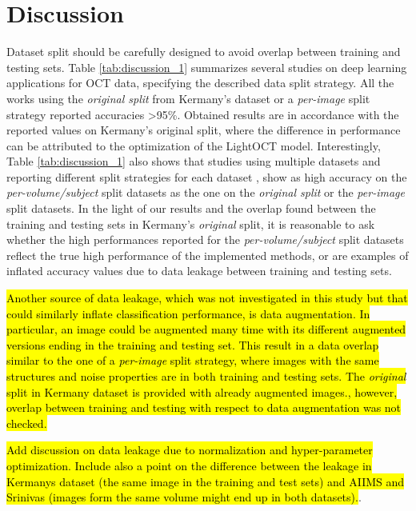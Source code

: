 \documentclass[fleqn,10pt]{wlscirep}
\begin{document}
\section*{Discussion}
Dataset split should be carefully designed to avoid overlap between training and testing sets. Table \ref{tab:discussion_1} summarizes several studies on deep learning applications for OCT data, specifying the described data split strategy. All the works using the \textit{original split} from Kermany’s dataset or a \textit{per-image} split strategy reported accuracies >95\%. Obtained results are in accordance with the reported values on Kermany’s original split, where the difference in performance can be attributed to the optimization of the LightOCT model. Interestingly, Table \ref{tab:discussion_1} also shows that studies using multiple datasets and reporting different split strategies for each dataset \cite{butola2020deep,kamran2019optic, thomas2021novel}, show as high accuracy on the \mbox{\textit{per-volume/subject}} split datasets as the one on the \textit{original split} or the \textit{per-image} split datasets. In the light of our results and the overlap found between the training and testing sets in Kermany’s \textit{original} split, it is reasonable to ask whether the high performances reported for the \textit{per-volume/subject} split datasets reflect the true high performance of the implemented methods, or are examples of inflated accuracy values due to data leakage between training and testing sets. 

\hl{Another source of data leakage, which was not investigated in this study but that could similarly inflate classification performance, is data augmentation.  In particular, an image could be augmented many time with its different augmented versions ending in the training and testing set.  This result in a data overlap similar to the one of a \textit{per-image} split strategy, where images with the same structures and noise properties are in both training and testing sets. The \textit{original} split in Kermany dataset is provided with already augmented images., however, overlap between training and testing with respect to data augmentation was not checked. }

\hl{Add discussion on data leakage due to normalization and hyper-parameter optimization. Include also a point on the difference between the leakage in Kermanys dataset (the same image in the training and test sets) and AIIMS and Srinivas (images form the same volume might end up in both datasets).}.
\end{document}
